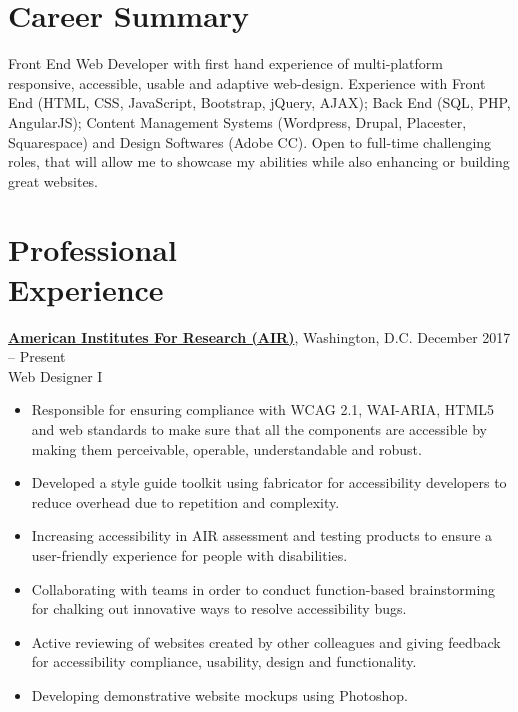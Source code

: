 \documentclass[margin,line]{res}
\begin{document}
\begin{resume} 
 


\section{Career Summary}

Front End Web Developer with first hand experience of multi-platform responsive, accessible, usable and adaptive web-design. Experience with Front End (HTML, CSS, JavaScript, Bootstrap, jQuery, AJAX); Back End (SQL, PHP, AngularJS); Content Management Systems (Wordpress, Drupal, Placester, Squarespace) and Design Softwares (Adobe CC). Open to full-time challenging roles, that will allow me to showcase my abilities while also enhancing or building great websites.

\section{Professional \\Experience}

\href{https://www.air.org/}{\noindent\bf American Institutes For Research (AIR)}, Washington, D.C. \hfill{December 2017 -- Present}\\
Web Designer I
\begin{itemize} \itemsep -2pt  %
 \item Responsible for ensuring compliance with WCAG 2.1, WAI-ARIA, HTML5 and web standards to make sure that all the components are accessible by making them perceivable, operable, understandable and robust.  
 \item Developed a style guide toolkit using fabricator for accessibility developers to reduce overhead due to repetition and complexity. 
 \item Increasing accessibility in AIR assessment and testing products to ensure a user-friendly experience for people with disabilities.  
 \item Collaborating with teams in order to conduct function-based brainstorming for chalking out innovative ways to resolve accessibility bugs.
 \item Active reviewing of websites created by other colleagues and giving feedback for accessibility compliance, usability, design and functionality. 
 \item  Developing demonstrative website mockups using Photoshop.


\end{itemize}
\end{resume}
\end{document}
